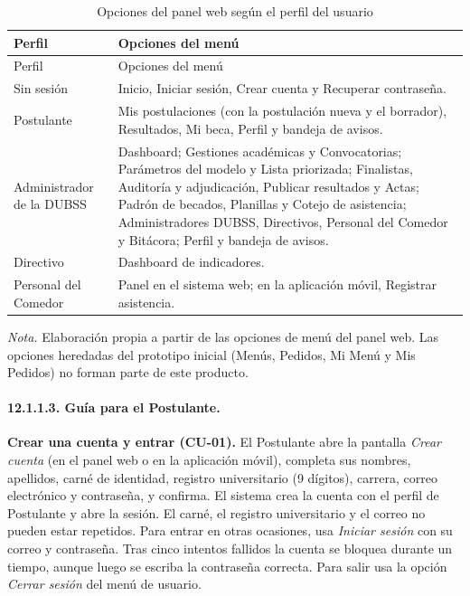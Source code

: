 \begin{longtable}{>{\raggedright\arraybackslash}p{3.4cm} >{\raggedright\arraybackslash}p{9.4cm}}
\caption{Opciones del panel web según el perfil del usuario}\label{tab:menu_por_rol}\\
\toprule
Perfil & Opciones del menú \\
\midrule
\endfirsthead
\toprule
Perfil & Opciones del menú \\
\midrule
\endhead
\bottomrule
\endfoot
Sin sesión & Inicio, Iniciar sesión, Crear cuenta y Recuperar contraseña. \\
Postulante & Mis postulaciones (con la postulación nueva y el borrador), Resultados, Mi beca, Perfil y bandeja de avisos. \\
Administrador de la DUBSS & Dashboard; Gestiones académicas y Convocatorias; Parámetros del modelo y Lista priorizada; Finalistas, Auditoría y adjudicación, Publicar resultados y Actas; Padrón de becados, Planillas y Cotejo de asistencia; Administradores DUBSS, Directivos, Personal del Comedor y Bitácora; Perfil y bandeja de avisos. \\
Directivo & Dashboard de indicadores. \\
Personal del Comedor & Panel en el sistema web; en la aplicación móvil, Registrar asistencia. \\
\end{longtable}
\noindent\textit{Nota.} Elaboración propia a partir de las opciones de menú del panel web. Las opciones heredadas del prototipo inicial (Menús, Pedidos, Mi Menú y Mis Pedidos) no forman parte de este producto.

\paragraph{12.1.1.3. Guía para el Postulante.}

\textbf{Crear una cuenta y entrar (CU-01).} El Postulante abre la pantalla \textit{Crear cuenta} (en el panel web o en la aplicación móvil), completa sus nombres, apellidos, carné de identidad, registro universitario (9 dígitos), carrera, correo electrónico y contraseña, y confirma. El sistema crea la cuenta con el perfil de Postulante y abre la sesión. El carné, el registro universitario y el correo no pueden estar repetidos. Para entrar en otras ocasiones, usa \textit{Iniciar sesión} con su correo y contraseña. Tras cinco intentos fallidos la cuenta se bloquea durante un tiempo, aunque luego se escriba la contraseña correcta. Para salir usa la opción \textit{Cerrar sesión} del menú de usuario.

